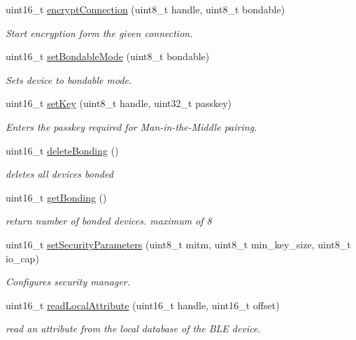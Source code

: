 \begin{DoxyCompactItemize}
uint16\+\_\+t \hyperlink{class_wasp_b_l_e_a20232a9ae70b6ab112dfd3511c4287a7}{encrypt\+Connection} (uint8\+\_\+t handle, uint8\+\_\+t bondable)
\begin{DoxyCompactList}\small\item\em Start encryption form the given connection. \end{DoxyCompactList}\item 
uint16\+\_\+t \hyperlink{class_wasp_b_l_e_af8d0f18ba63575774c48cc9a2d4912d7}{set\+Bondable\+Mode} (uint8\+\_\+t bondable)
\begin{DoxyCompactList}\small\item\em Sets device to bondable mode. \end{DoxyCompactList}\item 
uint16\+\_\+t \hyperlink{class_wasp_b_l_e_adc09f07207af188fc109a569cfbcc149}{set\+Key} (uint8\+\_\+t handle, uint32\+\_\+t passkey)
\begin{DoxyCompactList}\small\item\em Enters the passkey required for Man-\/in-\/the-\/\+Middle pairing. \end{DoxyCompactList}\item 
uint16\+\_\+t \hyperlink{class_wasp_b_l_e_a2f257e929557338eb6cba6c2f9cc4a98}{delete\+Bonding} ()
\begin{DoxyCompactList}\small\item\em deletes all devices bonded \end{DoxyCompactList}\item 
uint16\+\_\+t \hyperlink{class_wasp_b_l_e_ac02d3b9d0be79ccc2b1aa75eb090bcf4}{get\+Bonding} ()
\begin{DoxyCompactList}\small\item\em return number of bonded devices. maximum of 8 \end{DoxyCompactList}\item 
uint16\+\_\+t \hyperlink{class_wasp_b_l_e_a18ea780f28c137722a0e73d01f8c8e44}{set\+Security\+Parameters} (uint8\+\_\+t mitm, uint8\+\_\+t min\+\_\+key\+\_\+size, uint8\+\_\+t io\+\_\+cap)
\begin{DoxyCompactList}\small\item\em Configures security manager. \end{DoxyCompactList}\item 
uint16\+\_\+t \hyperlink{class_wasp_b_l_e_a753856ecc10fd863ea5ff2b23c9eff03}{read\+Local\+Attribute} (uint16\+\_\+t handle, uint16\+\_\+t offset)
\begin{DoxyCompactList}\small\item\em read an attribute from the local database of the B\+LE device. \end{DoxyCompactList}\item 

\end{DoxyCompactItemize}
